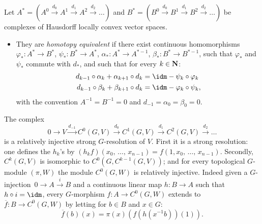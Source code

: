 Let $A^* = (A^0 \stackrel{d_0}{\to} A^1 \stackrel{d_1}{\to} A^2 \stackrel{d_2}{\to}\dots)$ and $B^* = (B^0 \stackrel{d_0}{\to} B^1 \stackrel{d_1}{\to} B^2 \stackrel{d_2}{\to}\dots)$ be complexes of Hausdorff locally convex vector spaces.
\begin{itemize}
\item They are \emph{homotopy equivalent} if there exist continuous homomorphisms $\varphi_* : A^*\to B^*$, $\psi_* : B^* \to A^*$, $\alpha_* : A^* \to A^{*-1}$, $\beta_* : B^* \to B^{*-1}$, such that $\varphi_*$ and $\psi_*$ commute with $d_*$, and such that for every $k \in {\bf N}$:
\begin{align*}
d_{k-1} \circ \alpha_k + \alpha_{k+1} \circ d_k &= \idm - \psi_k \circ \varphi_k\\
d _{k-1}\circ \beta_k + \beta_{k+1} \circ d_k &= \idm - \varphi_k \circ \psi_k,
\end{align*}
with the convention $A^{-1} = B^{-1} = 0$ and $d_{-1} = \alpha _0 = \beta _0 = 0$.
\end{itemize}

\begin{exam}\label{bar_ex}
The complex
\[
0 \to V \stackrel{d_{-1}}{\to} C^0(G,V) \stackrel{d_0}{\to} C^1(G,V) \stackrel{d_1}{\to} C^2(G,V) \stackrel{d_2}{\to}\dots
\]
is a relatively injective strong $G$-resolution of $V$. First it is a strong resolution: one defines the $h_k$'s by $(h_k f) (x_0,\,\dots,\,x_{n-1}) = f(1, x_0,\,\dots,\,x_{n-1})$. Secondly, $C^k(G, V)$ is isomorphic to $C^0(G, C^{k-1} (G,V))$; and for every topological $G$-module $(\pi, W)$ the module $C^0(G, W)$ is relatively injective. Indeed given a $G$-injection~$0 \to A \stackrel{i}{\to} B$ and a continuous linear map $h: B \to A$ such that $h \circ i = \idm$, every $G$-morphism $f: A \to C^0(G, W)$ extends to $\overline{f}: B \to C^0(G, W)$ by letting for $b \in B$ and $x \in G$:
\[
\overline{f} (b)(x) = \pi (x) \left(f\left(h(x^{-1}b)\right)(1)\right).
\]
\end{exam}

